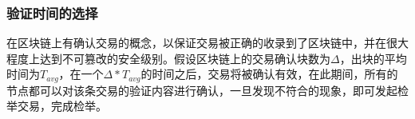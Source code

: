 \subsubsection{验证时间的选择}

在区块链上有确认交易的概念，以保证交易被正确的收录到了区块链中，并在很大程度上达到不可篡改的安全级别\cite{nakamoto2008bitcoin}。假设区块链上的交易确认块数为$\Delta$，出块的平均时间为$T_{avg}$，在一个$\Delta*T_{avg}$的时间之后，交易将被确认有效，在此期间，所有的节点都可以对该条交易的验证内容进行确认，一旦发现不符合的现象，即可发起检举交易，完成检举。







